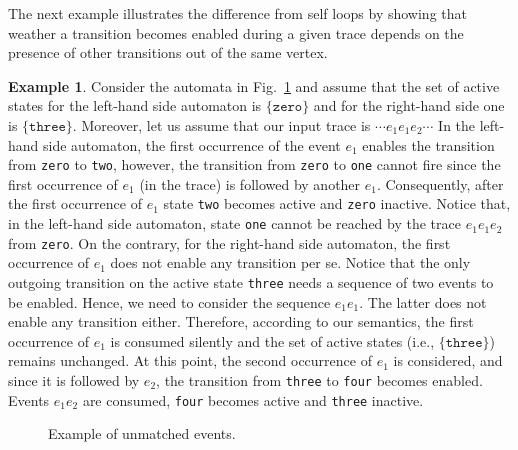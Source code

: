 \documentclass[9pt, preprint]{sigplanconf} %
\theoremstyle{definition}
\newtheorem{example}{Example}
\theoremstyle{remark}
\begin{document}
The next example illustrates the difference from self loops by showing
that weather a transition becomes enabled during a given trace depends
on the presence of other transitions out of the same vertex. 
\begin{example}
Consider the automata in Fig.~\ref{fig:unmatched-example} and assume that the set of active states for the left-hand side automaton is $\{ \texttt{zero} \}$ and for the right-hand side one is $\{ \texttt{three}\}$.
Moreover, let us assume that our input trace is $\cdots e_1 e_1 e_2 \cdots$ In the left-hand side automaton, the first occurrence of the event $e_1$ enables the transition  from {\tt zero} to {\tt two}, however, the transition from {\tt zero} to {\tt one} cannot fire since the first occurrence of $e_1$ (in the trace) is followed by another $e_1$.
Consequently, after the first occurrence of $e_1$ state {\tt two} becomes active and {\tt zero} inactive.
Notice that, in the left-hand side automaton, state {\tt one} cannot be reached by the trace $e_1 e_1 e_2 $ from {\tt zero}.
On the contrary, for the right-hand side automaton, the first occurrence of $e_1$ does not enable any transition per se.
Notice that the only outgoing transition on the active state {\tt three} needs a sequence of two events to be enabled.
Hence, we need to consider the sequence $e_1e_1$.
The latter does not enable any transition either.
Therefore, according to our semantics,  the first occurrence of $e_1$ is consumed silently and the set of active states (i.e., $\{ \texttt{three} \}$) remains unchanged.
At this point, the second occurrence of $e_1$ is considered, and since it is followed by $e_2$, the transition from {\tt three} to {\tt four} becomes enabled.
Events $e_1e_2$ are consumed, {\tt four} becomes active and {\tt three} inactive.
\end{example}

\begin{figure}[t]
\caption{Example of unmatched events.}
\label{fig:unmatched-example}
\end{figure}
\end{document}
